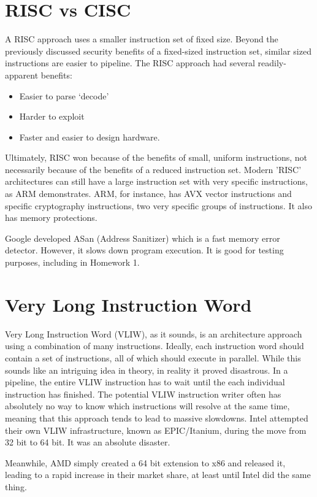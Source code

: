 \documentclass[twoside]{article}
\begin{document}
\section{RISC vs CISC}
A RISC approach uses a smaller instruction set of fixed size. Beyond the previously discussed security benefits of a fixed-sized instruction set, similar sized instructions are easier to pipeline.
The RISC approach had several readily-apparent benefits:
\begin{itemize}
	\item Easier to parse `decode'
	\item Harder to exploit
	\item Faster and easier to design hardware.
\end{itemize}
Ultimately, RISC won because of the benefits of small, uniform instructions, not necessarily because of the benefits of a reduced instruction set. Modern 'RISC' architectures can still have a large instruction set with very specific instructions, as ARM demonstrates. ARM, for instance, has AVX vector instructions and specific cryptography instructions, two very specific groups of instructions. It also has memory protections. 

Google developed ASan (Address Sanitizer) which is a fast memory error detector. However, it slows down program execution. It is good for testing purposes, including in Homework 1.

\section{Very Long Instruction Word}
Very Long Instruction Word (VLIW), as it sounds, is an architecture approach using a combination of many instructions. Ideally, each instruction word should contain a set of instructions, all of which should execute in parallel. While this sounds like an intriguing idea in theory, in reality it proved disastrous. In a pipeline, the entire VLIW instruction has to wait until the each individual instruction has finished. The potential VLIW instruction writer often has absolutely no way to know which instructions will resolve at the same time, meaning that this approach tends to lead to massive slowdowns. Intel attempted their own VLIW infrastructure, known as EPIC/Itanium, during the move from 32 bit to 64 bit. It was an absolute disaster.

Meanwhile, AMD simply created a 64 bit extension to x86 and released it, leading to a rapid increase in their market share, at least until Intel did the same thing.
\end{document}
